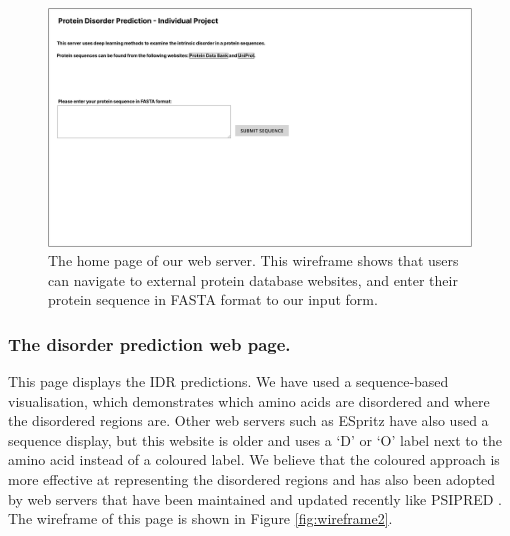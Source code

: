\documentclass{l4proj}
\begin{document}
\begin{figure}[!ht]
    \centering
    \includegraphics[width=\linewidth]{dissertation/images/Index - form input.pdf}
    
    \caption{The home page of our web server. This wireframe shows that users can navigate to external protein database websites, and enter their protein sequence in FASTA format to our input form.}
    
    \label{fig:wireframe1} 
\end{figure}

\subsubsection{The disorder prediction web page.}

This page displays the IDR predictions. We have used a sequence-based visualisation, which demonstrates which amino acids are disordered and where the disordered regions are. Other web servers such as ESpritz \citep{Walsh:11} have also used a sequence display, but this website is older and uses a ‘D’ or ‘O’ label next to the amino acid instead of a coloured label. We believe that the coloured approach is more effective at representing the disordered regions and has also been adopted by web servers that have been maintained and updated recently like PSIPRED \citep{DISOPRED:server}. The wireframe of this page is shown in Figure \ref{fig:wireframe2}.
\end{document}
